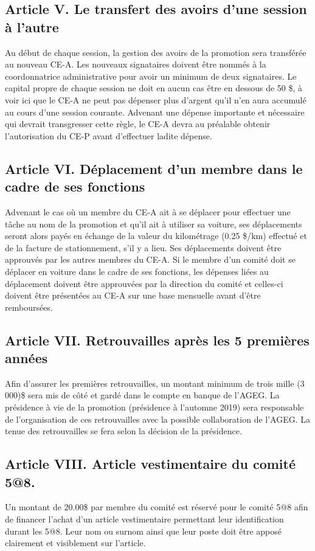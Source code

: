 \subsection*{Article V. Le transfert des avoirs d'une session à l'autre}
Au début de chaque session, la gestion des avoirs de la promotion sera transférée au nouveau CE-A. Les nouveaux signataires doivent être nommés à la coordonnatrice administrative pour avoir un minimum de deux signataires. Le capital propre de chaque session ne doit en aucun cas être en dessous de 50 \$, à voir ici que le CE-A ne peut pas dépenser plus d’argent qu’il n’en aura accumulé au cours d’une session courante. Advenant une dépense importante et nécessaire qui devrait transgresser cette règle, le CE-A devra au préalable obtenir l’autorisation du CE-P avant d’effectuer ladite dépense.

\subsection*{Article VI. Déplacement d'un membre dans le cadre de ses fonctions}
Advenant le cas où un membre du CE-A ait à se déplacer pour effectuer une tâche au nom de la promotion et qu’il ait à utiliser sa voiture, ses déplacements seront alors payés en échange de la valeur du kilométrage (0.25 \$/km) effectué et de la facture de stationnement, s’il y a lieu. Ses déplacements doivent être approuvés par les autres membres du CE-A. Si le membre d’un comité doit se déplacer en voiture dans le cadre de ses fonctions, les dépenses liées au déplacement doivent être approuvées par la direction du comité et celles-ci doivent être présentées au CE-A sur une base mensuelle avant d’être remboursées.

\subsection*{Article VII. Retrouvailles après les 5 premières années}
Afin d'assurer les premières retrouvailles, un montant minimum de trois mille (3 000)\$ sera mis de côté et gardé dans le compte en banque de l’AGEG. La présidence à vie de la promotion (présidence à l’automne 2019) sera responsable de l'organisation de ces retrouvailles avec la possible collaboration de l'AGEG. La tenue des retrouvailles se fera selon la décision de la présidence.

\subsection*{Article  VIII.  Article vestimentaire du comité 5@8.}
Un montant de 20.00\$ par membre du comité est réservé  pour  le  comité  5@8  afin  de  financer l’achat d’un article vestimentaire permettant leur identification durant les 5@8. Leur nom ou surnom ainsi que leur poste doit être apposé clairement et visiblement sur l’article.